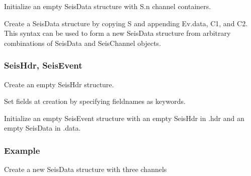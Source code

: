 \documentclass[letterpaper,11pt,english]{sphinxmanual}
\begin{document}
Initialize an empty SeisData structure with S.n channel containers.

\begin{fulllineitems}
\end{fulllineitems}


Create a SeisData structure by copying S and appending Ev.data, C1, and C2. This syntax can be used to form a new SeisData structure from arbitrary combinations of SeisData and SeisChannel objects.


\subsubsection{SeisHdr, SeisEvent}
\label{\detokenize{src/seisdata:seishdr-seisevent}}

\begin{fulllineitems}
\label{\detokenize{src/seisdata:SeisHdr}}
\end{fulllineitems}


Create an empty SeisHdr structure.

\begin{fulllineitems}
\end{fulllineitems}


Set fields at creation by specifying fieldnames as keywords.

\begin{fulllineitems}
\label{\detokenize{src/seisdata:SeisEvent}}
\end{fulllineitems}


Initialize an empty SeisEvent structure with an empty SeisHdr in .hdr and an empty SeisData in .data.


\subsubsection{Example}
\label{\detokenize{src/seisdata:example}}
Create a new SeisData structure with three channels
\end{document}
